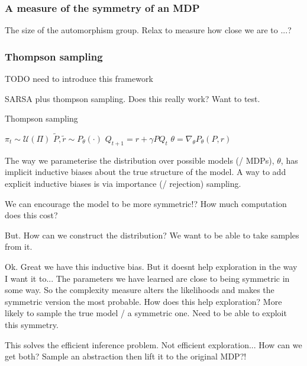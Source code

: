 \subsubsection{A measure of the symmetry of an MDP}

The size of the automorphism group.
Relax to measure how close we are to ...?


\subsubsection{Thompson sampling} \label{thompson-sampling}

{\color{red}TODO need to introduce this framework}

SARSA plus thompson sampling. Does this really work? Want to test.

\begin{algorithm}
	\caption{Thompson sampling}
	\begin{algorithmic}[1]

		\State $\pi_t \sim \mathcal U(\Pi)$
		\State $\tilde P, \tilde r \sim P_{\theta}(\cdot)$
		\State $Q_{t+1} =  r + \gamma P Q_t$ 
		\State $\theta = \nabla_{\theta} P_{\theta}(P, r)$ 

		\EndWhile
		\State \algorithmicreturn{ $\pi$}
		\EndProcedure

	\end{algorithmic}
\end{algorithm}

The way we parameterise the distribution over possible models (/ MDPs), $\theta$, has implicit inductive biases about the true structure of the model.
A way to add explicit inductive biases is via importance (/ rejection) sampling.

We can encourage the model to be more symmetric!?
How much computation does this cost?

But. How can we construct the distribution? We want to be able to take samples
from it.

Ok. Great we have this inductive bias. But it doesnt help exploration in the way I want it to...
The parameters we have learned are close to being symmetric in some way. So the complexity measure alters the likelihoods and makes the symmetric version the most probable.
How does this help exploration? More likely to sample the true model / a symmetric one. Need to be able to exploit this symmetry.

This solves the efficient inference problem. Not efficient exploration... How can we get both?
Sample an abstraction then lift it to the original MDP?!


